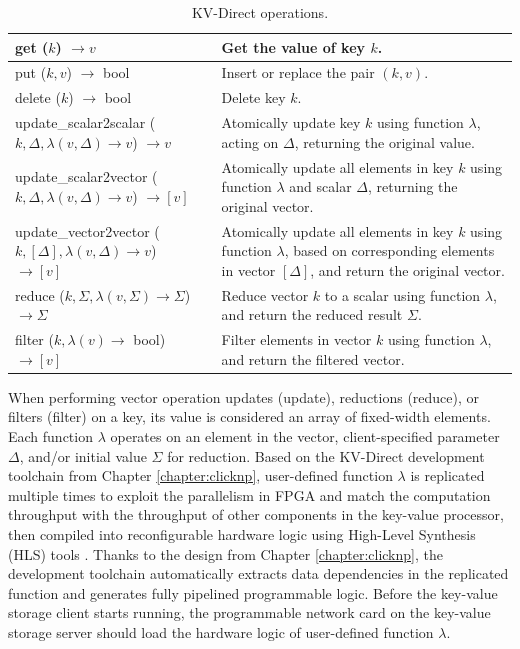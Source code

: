 \begin{table}
\centering
\caption{KV-Direct operations.}
\label{kvdirect:tab:kv-operations}
\small
\begin{tabular}{p{}|p{} }
\toprule
get ($k$) $\rightarrow v$ & Get the value of key $k$. \\
\midrule
put ($k, v$) $\rightarrow$ bool & Insert or replace the pair $(k, v)$. \\
\midrule
delete ($k$) $\rightarrow$ bool & Delete key $k$. \\
\midrule
\midrule
update{\_}scalar2scalar ($k, \Delta, \lambda(v, \Delta) \rightarrow v$) $\rightarrow v$ & Atomically update key $k$ using function $\lambda$, acting on $\Delta$, returning the original value.\\
\midrule
update{\_}scalar2vector ($k, \Delta, \lambda(v, \Delta) \rightarrow v$) $\rightarrow [v]$ & Atomically update all elements in key $k$ using function $\lambda$ and scalar $\Delta$, returning the original vector. \\
\midrule
update{\_}vector2vector ($k, [\Delta], \lambda(v, \Delta) \rightarrow v$) $\rightarrow [v]$ & Atomically update all elements in key $k$ using function $\lambda$, based on corresponding elements in vector $[\Delta]$, and return the original vector. \\
\midrule
reduce ($k, \Sigma, \lambda(v, \Sigma) \rightarrow \Sigma$) $\rightarrow \Sigma$ & Reduce vector $k$ to a scalar using function $\lambda$, and return the reduced result $\Sigma$. \\
\midrule
filter ($k, \lambda(v) \rightarrow$ bool) $\rightarrow [v]$ & Filter elements in vector $k$ using function $\lambda$, and return the filtered vector. \\
\bottomrule
\end{tabular}
\end{table}

When performing vector operation updates (update), reductions (reduce), or filters (filter) on a key, its value is considered an array of fixed-width elements.
Each function $\lambda$ operates on an element in the vector, client-specified parameter $\Delta$, and/or initial value $\Sigma$ for reduction.
Based on the KV-Direct development toolchain from Chapter \ref{chapter:clicknp}, user-defined function $\lambda$ is replicated multiple times to exploit the parallelism in FPGA and match the computation throughput with the throughput of other components in the key-value processor, then compiled into reconfigurable hardware logic using High-Level Synthesis (HLS) tools \cite{aoc,sdaccel}.
Thanks to the design from Chapter \ref{chapter:clicknp}, the development toolchain automatically extracts data dependencies in the replicated function and generates fully pipelined programmable logic.
Before the key-value storage client starts running, the programmable network card on the key-value storage server should load the hardware logic of user-defined function $\lambda$.

